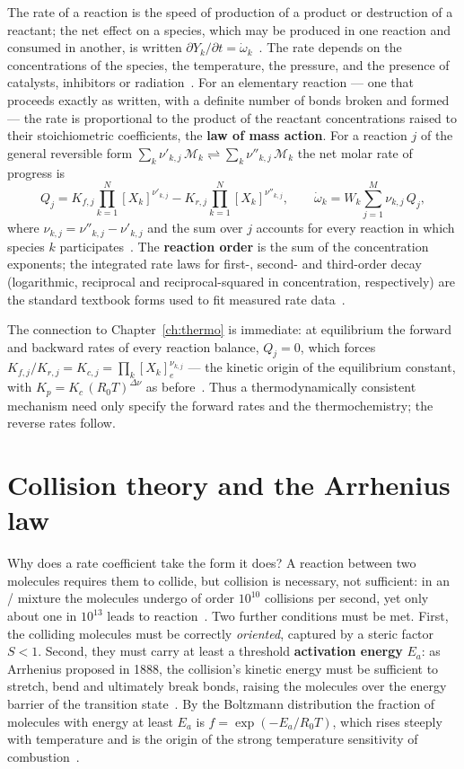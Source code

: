The rate of a reaction is the speed of production of a product or destruction of a reactant; the net effect on a species, which may be produced in one reaction and consumed in another, is written $\partial Y_k/\partial t=\dot\omega_k$~\cite{lecture3}. The rate depends on the concentrations of the species, the temperature, the pressure, and the presence of catalysts, inhibitors or radiation~\cite{lecture3}. For an elementary reaction --- one that proceeds exactly as written, with a definite number of bonds broken and formed --- the rate is proportional to the product of the reactant concentrations raised to their stoichiometric coefficients, the \textbf{law of mass action}. For a reaction $j$ of the general reversible form $\sum_k\nu'_{k,j}\,\mathcal{M}_k\rightleftharpoons\sum_k\nu''_{k,j}\,\mathcal{M}_k$ the net molar rate of progress is
\begin{equation}
Q_j=K_{f,j}\prod_{k=1}^{N}[X_k]^{\nu'_{k,j}}-K_{r,j}\prod_{k=1}^{N}[X_k]^{\nu''_{k,j}},\qquad
\dot\omega_k=W_k\sum_{j=1}^{M}\nu_{k,j}\,Q_j,
\label{eq:rate-of-progress}
\end{equation}
where $\nu_{k,j}=\nu''_{k,j}-\nu'_{k,j}$ and the sum over $j$ accounts for every reaction in which species $k$ participates~\cite{lecture3,warnatz2006combustion}. The \textbf{reaction order} is the sum of the concentration exponents; the integrated rate laws for first-, second- and third-order decay (logarithmic, reciprocal and reciprocal-squared in concentration, respectively) are the standard textbook forms used to fit measured rate data~\cite{lecture3}.

The connection to Chapter~\ref{ch:thermo} is immediate: at equilibrium the forward and backward rates of every reaction balance, $Q_j=0$, which forces $K_{f,j}/K_{r,j}=K_{c,j}=\prod_k[X_{k}]_e^{\nu_{k,j}}$ --- the kinetic origin of the equilibrium constant, with $K_p=K_c\,(R_0T)^{\Delta\nu}$ as before~\cite{lecture3}. Thus a thermodynamically consistent mechanism need only specify the forward rates and the thermochemistry; the reverse rates follow.

\section{Collision theory and the Arrhenius law}

Why does a rate coefficient take the form it does? A reaction between two molecules requires them to collide, but collision is necessary, not sufficient: in an / mixture the molecules undergo of order $10^{10}$ collisions per second, yet only about one in $10^{13}$ leads to reaction~\cite{lecture3}. Two further conditions must be met. First, the colliding molecules must be correctly \emph{oriented}, captured by a steric factor $S<1$. Second, they must carry at least a threshold \textbf{activation energy} $E_a$: as Arrhenius proposed in 1888, the collision's kinetic energy must be sufficient to stretch, bend and ultimately break bonds, raising the molecules over the energy barrier of the transition state~\cite{lecture3}. By the Boltzmann distribution the fraction of molecules with energy at least $E_a$ is $f=\exp(-E_a/R_0T)$, which rises steeply with temperature and is the origin of the strong temperature sensitivity of combustion~\cite{lecture3}.

